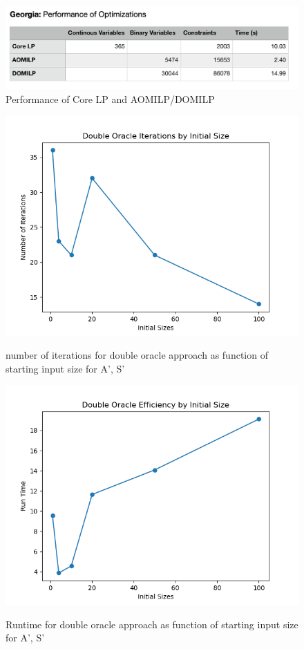 \documentclass[letterpaper]{article} %
\begin{document}
\begin{figure}
    \includegraphics[width=\linewidth]{georgia_perfs}
    \caption{Performance of Core LP and AOMILP/DOMILP}
    \label{georgia_perfs}
\end{figure}


\begin{figure}
    \includegraphics[width=\linewidth]{oracle_its}
    \label{oracle_its}
    \caption{number of iterations for double oracle approach as function of starting input size for A', S'}
\end{figure}

\begin{figure}
    \includegraphics[width=\linewidth]{oracle_times}
    \label{oracle_times}
    \caption{Runtime for double oracle approach as function of starting input size for A', S'}
\end{figure}
\end{document}
